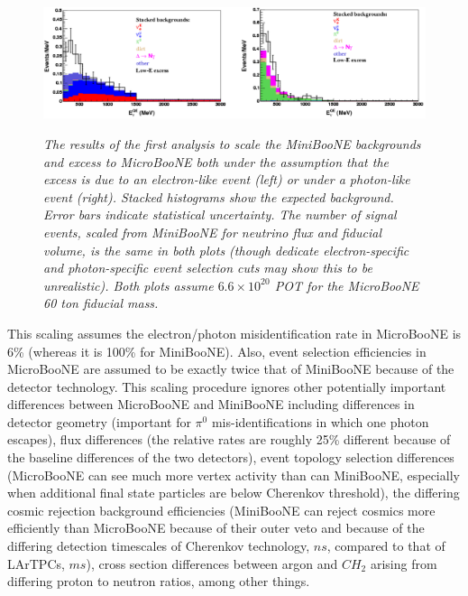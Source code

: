 \begin{figure}[ht!]
\centering
	\includegraphics[width=1.0\textwidth]{Figures/TDR_LEE_scaling.png} \\
\caption{\textit{The results of the first analysis to scale the MiniBooNE backgrounds and excess to MicroBooNE both under the assumption that the excess is due to an electron-like event (left) or under a photon-like event (right). Stacked histograms show the expected background. Error bars indicate statistical uncertainty. The number of signal events, scaled from MiniBooNE for neutrino flux and fiducial volume, is the same in both plots (though dedicate electron-specific and photon-specific event selection cuts may show this to be unrealistic). Both plots assume $6.6 \times 10^{20}$ POT for the MicroBooNE 60 ton fiducial mass.}}\label{TDR_LEE_scaling_fig}
\end{figure}


This scaling assumes the electron/photon misidentification rate in MicroBooNE is 6\% (whereas it is 100\% for MiniBooNE). Also, event selection efficiencies in MicroBooNE are assumed to be exactly twice that of MiniBooNE because of the detector technology. This scaling procedure ignores other potentially important differences between MicroBooNE and MiniBooNE including differences in detector geometry (important for $\pi^0$ mis-identifications in which one photon escapes), flux differences (the relative rates are roughly 25\% different because of the baseline differences of the two detectors), event topology selection differences (MicroBooNE can see much more vertex activity than can MiniBooNE, especially when additional final state particles are below Cherenkov threshold), the differing cosmic rejection background efficiencies (MiniBooNE can reject cosmics more efficiently than MicroBooNE because of their outer veto and because of the differing detection timescales of Cherenkov technology, $ns$, compared to that of LArTPCs, $ms$), cross section differences between argon and $CH_2$ arising from differing proton to neutron ratios, among other things.\\%

